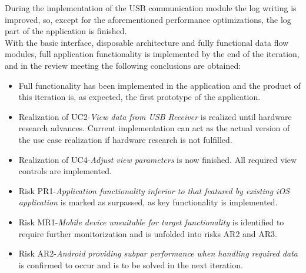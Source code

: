			During the implementation of the USB communication module the log writing is improved, so, except for the aforementioned performance optimizations, the log part of the application is finished.\\

			With the basic interface, disposable architecture and fully functional data flow modules, full application functionality is implemented by the end of the iteration, and in the review meeting the following conclusions are obtained:
			\begin{itemize}
				\item Full functionality has been implemented in the application and the product of this iteration is, as expected, the first prototype of the application.
				\item Realization of UC2-\emph{View data from USB Receiver} is realized until hardware research advances. Current implementation can act as the actual version of the use case realization if hardware research is not fulfilled.
				\item Realization of UC4-\emph{Adjust view parameters} is now finished. All required view controls are implemented.
				\item Risk PR1-\emph{Application functionality inferior to that featured by existing iOS application} is marked as surpassed, as key functionality is implemented.
				\item Risk MR1-\emph{Mobile device unsuitable for target functionality} is identified to require further monitorization and is unfolded into risks AR2 and AR3.
				\item Risk AR2-\emph{Android providing subpar performance when handling required data} is confirmed to occur and is to be solved in the next iteration.
			\end{itemize}


